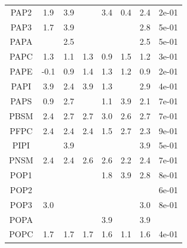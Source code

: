 \documentclass[9pt]{article}
\begin{document}
\begin{table}
{\begin{tabular}{| c || ccccc |cc|}
PAP2    &               1.9 &               3.9 &                 &                3.4 &                0.4 &  2.4 &  2e-01 \\
PAP3    &               1.7 &               3.9 &                 &                 &                 &  2.8 &  5e-01 \\
PAPA    &                &               2.5 &                 &                 &                 &  2.5 &  5e-01 \\
PAPC    &               1.3 &               1.1 &                1.3 &                0.9 &                1.5 &  1.2 &  3e-01 \\
PAPE    &              -0.1 &               0.9 &                1.4 &                1.3 &                1.2 &  0.9 &  2e-01 \\
PAPI    &               3.9 &               2.4 &                3.9 &                1.3 &                 &  2.9 &  4e-01 \\
PAPS    &               0.9 &               2.7 &                 &                1.1 &                3.9 &  2.1 &  7e-01 \\
PBSM    &               2.4 &               2.7 &                2.7 &                3.0 &                2.6 &  2.7 &  7e-01 \\
PFPC    &               2.4 &               2.4 &                2.4 &                1.5 &                2.7 &  2.3 &  9e-01 \\
PIPI    &                &               3.9 &                 &                 &                 &  3.9 &  5e-01 \\
PNSM    &               2.4 &               2.4 &                2.6 &                2.6 &                2.2 &  2.4 &  7e-01 \\
POP1    &                &                &                 &                1.8 &                3.9 &  2.8 &  8e-01 \\
POP2    &                &                &                 &                 &                 &   &  6e-01 \\
POP3    &               3.0 &                &                 &                 &                 &  3.0 &  8e-01 \\
POPA    &                &                &                 &                3.9 &                 &  3.9 &     \\
POPC    &               1.7 &               1.7 &                1.7 &                1.6 &                1.1 &  1.6 &  4e-01 \\

\end{tabular}}
\end{table}
\end{document}
